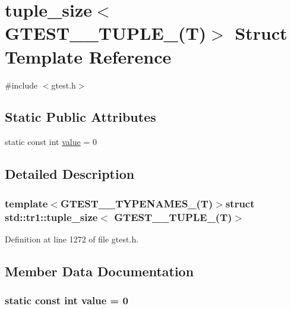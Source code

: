 \hypertarget{structstd_1_1tr1_1_1tuple__size_3_01GTEST__0__TUPLE___07T_08_4}{\section{tuple\-\_\-size$<$ \-G\-T\-E\-S\-T\-\_\-\_\-\-T\-U\-P\-L\-E\-\_\-(\-T)$>$ \-Struct \-Template \-Reference}
\label{de/df7/structstd_1_1tr1_1_1tuple__size_3_01GTEST__0__TUPLE___07T_08_4}
}


{\ttfamily \#include $<$gtest.\-h$>$}

\subsection*{\-Static \-Public \-Attributes}
\begin{DoxyCompactItemize}
\item 
static const int \hyperlink{structstd_1_1tr1_1_1tuple__size_3_01GTEST__0__TUPLE___07T_08_4_a3851384a21258869159d444f38396c70}{value} = 0
\end{DoxyCompactItemize}


\subsection{\-Detailed \-Description}
\subsubsection*{template$<$\-G\-T\-E\-S\-T\-\_\-\_\-\-T\-Y\-P\-E\-N\-A\-M\-E\-S\-\_\-(\-T)$>$struct std\-::tr1\-::tuple\-\_\-size$<$ G\-T\-E\-S\-T\-\_\-\_\-\-T\-U\-P\-L\-E\-\_\-(\-T)$>$}



\-Definition at line 1272 of file gtest.\-h.



\subsection{\-Member \-Data \-Documentation}
\hypertarget{structstd_1_1tr1_1_1tuple__size_3_01GTEST__0__TUPLE___07T_08_4_a3851384a21258869159d444f38396c70}{
\subsubsection[{value}]{\setlength{\rightskip}{0pt plus 5cm}static const int {\bf value} = 0}}\label{de/df7/structstd_1_1tr1_1_1tuple__size_3_01GTEST__0__TUPLE___07T_08_4_a3851384a21258869159d444f38396c70}


